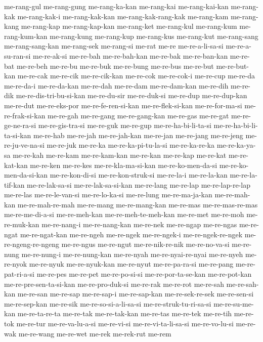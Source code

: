 {me-rang-gul me-rang-gung me-rang-ka-kan me-rang-kai me-rang-kai-kan
me-rang-kak me-rang-kak-i me-rang-kak-kan me-rang-kak-rang-kak me-rang-kam
me-rang-kang me-rang-kap me-rang-kap-kan me-rang-ket me-rang-kul
me-rang-kum me-rang-kum-kan me-rang-kung me-rang-kup me-rang-kus
me-rang-kut me-rang-sang me-rang-sang-kan me-rang-sek me-rang-si me-rat
me-re me-re-a-li-sa-si me-re-a-su-ran-si me-re-ak-si me-re-bah
me-re-bah-kan me-re-bak me-re-ban-kan me-re-bat me-re-beh me-re-bu
me-re-buk me-re-bung me-re-bus me-re-but me-re-but-kan me-re-cak me-re-cik
me-re-cik-kan me-re-cok me-re-cok-i me-re-cup me-re-da me-re-da-i
me-re-da-kan me-re-dah me-re-dam me-re-dam-kan me-re-dih me-re-dik
me-re-dis-tri-bu-si-kan me-re-du-sir me-re-duk-si me-re-dup me-re-dup-kan
me-re-dut me-re-eks-por me-re-fe-ren-si-kan me-re-flek-si-kan
me-re-for-ma-si me-re-frak-si-kan me-re-gah me-re-gang me-re-gang-kan
me-re-gas me-re-gat me-re-ge-ne-ra-si me-re-gis-tra-si me-re-guk me-re-gup
me-re-ha-bi-li-ta-si me-re-ha-bi-li-ta-si-kan me-re-hab me-re-jah
me-re-jah-kan me-re-jan me-re-jang me-re-jeng me-re-ju-ve-na-si me-re-juk
me-re-ka me-re-ka-pi-tu-la-si me-re-ka-re-ka me-re-ka-ya-sa me-re-kah
me-re-kam me-re-kam-kan me-re-kan me-re-kap me-re-kat me-re-kat-kan
me-re-ken me-re-kes me-re-kla-ma-si-kan me-re-ko-men-da-si
me-re-ko-men-da-si-kan me-re-kon-di-si me-re-kon-struk-si me-re-la-i
me-re-la-kan me-re-la-tif-kan me-re-lak-sa-si me-re-lak-sa-si-kan
me-re-lang me-re-lap me-re-lap-re-lap me-re-las me-re-le-van-si
me-re-lo-ka-si me-re-lung me-re-ma-ja-kan me-re-mah-kan me-re-mah-re-mah
me-re-mang me-re-mang-kan me-re-mas me-re-mas-re-mas me-re-me-di-a-si
me-re-meh-kan me-re-meh-te-meh-kan me-re-met me-re-moh me-re-muk-kan
me-re-nang-i me-re-nang-kan me-re-nek me-re-ngap me-re-ngas me-re-ngat
me-re-ngat-kan me-re-ngeh me-re-ngek me-re-ngek-i me-re-ngek-re-ngek
me-re-ngeng-re-ngeng me-re-ngus me-re-ngut me-re-nik-re-nik me-re-no-va-si
me-re-nung me-re-nung-i me-re-nung-kan me-re-nyah me-re-nyai-re-nyai
me-re-nyeh me-re-nyok me-re-nyuk me-re-nyuk-kan me-re-nyut me-re-pa-ra-si
me-re-pang me-re-pat-ri-a-si me-re-pes me-re-pet me-re-po-si-si
me-re-por-ta-se-kan me-re-pot-kan me-re-pre-sen-ta-si-kan me-re-pro-duk-si
me-re-rak me-re-rot me-re-sah me-re-sah-kan me-re-san me-re-sap
me-re-sap-i me-re-sap-kan me-re-sek-re-sek me-re-sen-si me-re-sep-kan
me-re-sik me-re-so-si-a-li-sa-si me-re-struk-tu-ri-sa-si me-re-su-me-kan
me-re-ta-re-ta me-re-tak me-re-tak-kan me-re-tas me-re-tek me-re-tih
me-re-tok me-re-tur me-re-va-lu-a-si me-re-vi-si me-re-vi-ta-li-sa-si
me-re-vo-lu-si me-re-wak me-re-wang me-re-wet me-rek me-rek-rut me-rem
}

